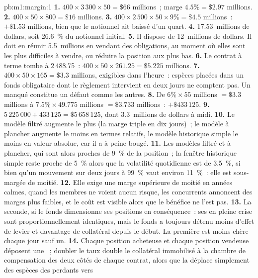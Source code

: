 \begin{solution}{pb:m1:margin:1}
\textbf{1.} $400 \times 3\,300 \times 50 = \$66$ millions~; marge $4.5\% =
\$2.97$ millions.
\textbf{2.} $400 \times 50 \times 800 = \$16$ millions.
\textbf{3.} $400 \times 2\,500 \times 50 \times 9\% = \$4.5$ millions~: $+\$1.53$
millions, bien que le notionnel ait baissé d'un quart.
\textbf{4.} 17.53~millions de dollars, soit 26.6~\% du notionnel initial.
\textbf{5.} Il dispose de 12~millions de dollars. Il doit en réunir 5.5~millions en vendant
des obligations, au moment où elles sont les plus difficiles à vendre, ou réduire la position aux
plus bas.
\textbf{6.} Le contrat à terme tombe à 2\,488.75~: $400 \times 50 \times 261.25 =
\$5.225$ millions.
\textbf{7.} $400 \times 50 \times 165 = \$3.3$ millions, exigibles dans l'heure~:
espèces placées dans un fonds obligataire dont le règlement intervient en deux jours ne comptent pas. Un  manqué constitue un défaut comme les autres.
\textbf{8.} De $6\% \times 55$ millions $= \$3.3$ millions à $7.5\% \times
49.775$ millions $= \$3.733$ millions~: $+\$433\,125$.
\textbf{9.} $5\,225\,000 + 433\,125 = \$5\,658\,125$, dont 3.3~millions de dollars à
midi.
\textbf{10.} Le modèle filtré augmente le plus (la marge triple en dix jours)~; le
modèle à plancher augmente le moins en termes relatifs, le modèle historique simple le
moins en valeur absolue, car il a à peine bougé.
\textbf{11.} Les modèles filtré et à plancher, qui sont alors proches de
9~\% de la position~; la fenêtre historique simple reste proche de 5~\% alors que
la volatilité quotidienne est de 3.5~\%, si bien qu'un mouvement sur deux jours à 99~\% vaut environ 11~\%~: elle est
sous-margée de moitié.
\textbf{12.} Elle exige une marge supérieure de moitié en années calmes, quand les membres ne voient
aucun risque, les concurrents annoncent des marges plus faibles, et le coût est visible alors que
le bénéfice ne l'est pas.
\textbf{13.} La seconde, si le fonds dimensionne ses positions en conséquence~: ses 
en pleine crise sont proportionnellement identiques, mais le fonds a toujours détenu moins
d'effet de levier et davantage de collatéral depuis le début. La première est moins chère chaque jour sauf
un.
\textbf{14.} Chaque position acheteuse et chaque position vendeuse déposent une ~; doubler
le taux double le collatéral immobilisé à la chambre de compensation des deux côtés de
chaque contrat, alors que la  déplace simplement des espèces des perdants vers

\end{solution}

